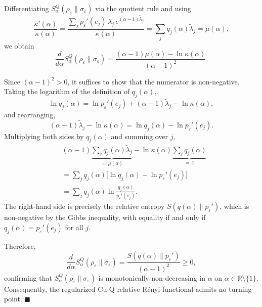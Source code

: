 \documentclass[a4paper, amsfonts, amssymb, amsmath, reprint, showkeys, nofootinbib, twoside, aps, pra]{revtex4-2}
\theoremstyle{definition}
\renewenvironment{proof}{\noindent{\bfseries Proof.}}{\hfill$\blacksquare$}
\begin{document}
\begin{proof}
Differentiating $S_\alpha^Q(\rho_\varepsilon\|\sigma_\varepsilon)$ via the quotient rule and using
\begin{equation}
\frac{\kappa'(\alpha)}{\kappa(\alpha)} 
= \frac{\sum_j p_\varepsilon '(e_j)\,\tilde{\lambda}_j\, e^{(\alpha-1)\tilde{\lambda}_j}}{\kappa(\alpha)} 
= \sum_j q_j(\alpha)\tilde{\lambda}_j = \mu(\alpha),
\end{equation}
we obtain
\begin{equation}
\frac{d}{d\alpha}S_\alpha^Q(\rho_\varepsilon\|\sigma_\varepsilon)
= \frac{(\alpha-1)\mu(\alpha) - \ln\kappa(\alpha)}{(\alpha-1)^2}.
\end{equation}

Since $(\alpha-1)^2 > 0$, it suffices to show that the numerator is non-negative. Taking the logarithm of the definition of $q_j(\alpha)$,
\begin{equation}
\ln q_j(\alpha) = \ln p_\varepsilon '(e_j) + (\alpha-1)\tilde{\lambda}_j - \ln\kappa(\alpha),
\end{equation}
and rearranging,
\begin{equation}
(\alpha-1)\tilde{\lambda}_j - \ln\kappa(\alpha) = \ln q_j(\alpha) - \ln p_\varepsilon '(e_j).
\end{equation}
Multiplying both sides by $q_j(\alpha)$ and summing over $j$,
\begin{equation}
\begin{aligned}
    &(\alpha-1)\underbrace{\sum_j q_j(\alpha)\tilde{\lambda}_j}_{=\,\mu(\alpha)} - \ln\kappa(\alpha)\underbrace{\sum_j q_j(\alpha)}_{=\,1} \\
    &= \sum_j q_j(\alpha)\bigl[\ln q_j(\alpha) - \ln p_\varepsilon '(e_j)\bigr] \\
    &= \sum_j q_j(\alpha)\ln\frac{q_j(\alpha)}{p_\varepsilon '(e_j)}.
\end{aligned}
\end{equation}
The right-hand side is precisely the relative entropy $S(q(\alpha)\|p_\varepsilon')$, which is non-negative by the Gibbs inequality, 
with equality if and only if $q_j(\alpha) = p_\varepsilon '(e_j)$ for all $j$.

Therefore,
\begin{equation}
\frac{d}{d\alpha}S^Q_\alpha(\rho_\varepsilon\|\sigma_\varepsilon) 
= \frac{S(q(\alpha)\|p_\varepsilon')}{(\alpha-1)^2} \ge 0,
\end{equation}
confirming that $S^Q_\alpha(\rho_\varepsilon\|\sigma_\varepsilon)$ is monotonically non-decreasing 
in $\alpha$ on $\alpha\in\mathbb R\setminus\{1\}$.
Consequently, the regularized Cu-Q relative Rényi functional admits no turning point.
\end{proof}
\end{document}
